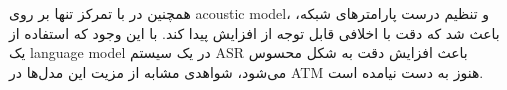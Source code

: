 همچنین در \cite{kelz2016potential} با تمرکز تنها بر روی \gls{acoustic model}، و
تنظیم درست پارامترهای شبکه، باعث شد که دقت با اخلافی قابل توجه از افزایش پیدا
کند. با این وجود که استفاده از یک \gls{language model} در یک سیستم \gls{ASR}
باعث افزایش دقت به شکل محسوس می‌شود، شواهدی مشابه از مزیت این مدل‌ها در
\gls{ATM} هنوز به دست نیامده است.